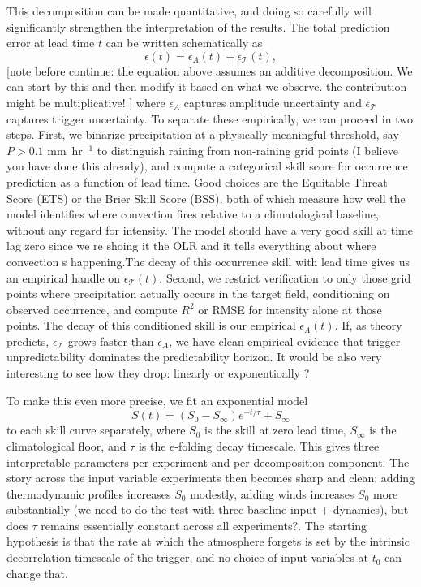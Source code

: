 \documentclass{article}
\begin{document}
This decomposition can be made quantitative, and doing so carefully will significantly strengthen the interpretation of the results. The total prediction error at lead time $t$ can be written schematically as
%
\begin{equation}
    \epsilon(t) = \epsilon_A(t) + \epsilon_{\mathcal{T}}(t),
\end{equation}
%
[note before continue: the equation above assumes an additive decomposition. We can start by this and then modify it based on what we observe. the contribution might be multiplicative! ]
where $\epsilon_A$ captures amplitude uncertainty and $\epsilon_{\mathcal{T}}$ captures trigger uncertainty. To separate these empirically, we can proceed in two steps. First, we binarize precipitation at a physically meaningful threshold, say $P > 0.1$ mm~hr$^{-1}$ to distinguish raining from non-raining grid points (I believe you have done this already), and compute a categorical skill score for occurrence prediction as a function of lead time. Good choices are the Equitable Threat Score (ETS) or the Brier Skill Score (BSS), both of which measure how well the model identifies where convection fires relative to a climatological baseline, without any regard for intensity. The model should have a very good skill at time lag zero since we re shoing it the OLR and it tells everything about where convection s happening.The decay of this occurrence skill with lead time gives us an empirical handle on $\epsilon_{\mathcal{T}}(t)$. Second, we restrict verification to only those grid points where precipitation actually occurs in the target field, conditioning on observed occurrence, and compute $R^2$ or RMSE for intensity alone at those points. The decay of this conditioned skill is our empirical $\epsilon_A(t)$. If, as theory predicts, $\epsilon_{\mathcal{T}}$ grows faster than $\epsilon_A$, we have clean empirical evidence that trigger unpredictability dominates the predictability horizon. It would be also very interesting to see how they drop: linearly or exponentioally ? 

To make this even more precise, we fit an exponential model
%
\begin{equation}
    S(t) = \left(S_0 - S_\infty\right) e^{-t/\tau} + S_\infty
\end{equation}
%
to each skill curve separately, where $S_0$ is the skill at zero lead time, $S_\infty$ is the climatological floor, and $\tau$ is the e-folding decay timescale. This gives three interpretable parameters per experiment and per decomposition component. The story across the input variable experiments then becomes sharp and clean: adding thermodynamic profiles increases $S_0$ modestly, adding winds increases $S_0$ more substantially (we need to do the test with three baseline input + dynamics), but does $\tau$ remains essentially constant across all experiments?. The starting hypothesis is that the rate at which the atmosphere forgets is set by the intrinsic decorrelation timescale of the trigger, and no choice of input variables at $t_0$ can change that.
\end{document}
